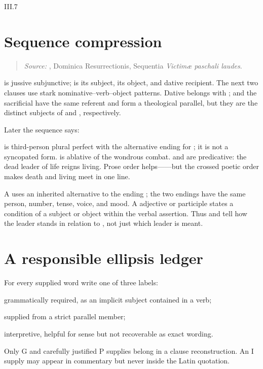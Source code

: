 \begin{courseunit}{III.7}
\section{Sequence compression}

\begin{quote}

\emph{Source:} \Missal, Dominica Resurrectionis, Sequentia
\emph{Victimæ paschali laudes}.
\end{quote}

 is jussive subjunctive;  is its subject,
 its object, and  dative recipient.
The next two clauses use stark nominative--verb--object patterns. Dative
 belongs with ; 
and the sacrificial  have the same referent and form a theological
parallel, but they are the distinct subjects of  and
, respectively.

Later the sequence says:
\begin{quote}
\end{quote}
 is third-person plural perfect with the alternative ending
 for ; it is not a syncopated form.  is ablative of the wondrous combat.
 and  are predicative: the dead leader of life reigns
living. Prose order helps------but the
crossed poetic order makes death and living meet in one line.

A  uses an inherited
alternative to the ending ; the two endings have the same person,
number, tense, voice, and mood. A  adjective or
participle states a condition of a subject or object within the verbal
assertion. Thus  and  tell how the leader stands
in relation to , not just which leader is meant.

\section{A responsible ellipsis ledger}

For every supplied word write one of three labels:
\begin{description}[style=nextline]
  \item[G] grammatically required, as an implicit subject contained in a verb;
  \item[P] supplied from a strict parallel member;
  \item[I] interpretive, helpful for sense but not recoverable as exact wording.
\end{description}
Only G and carefully justified P supplies belong in a clause reconstruction.
An I supply may appear in commentary but never inside the Latin quotation.





\end{courseunit}
